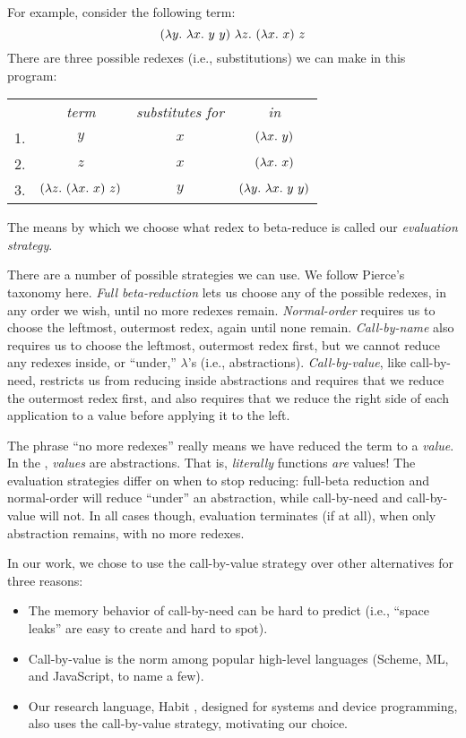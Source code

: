 \documentclass[12pt]{report}
\begin{document}
For example, consider the following term:
\begin{equation}
  \lamAppP{\lamAbs{y}{\lamApp{\lamAbs{x}{y}}{y}}} %
         {\lamAbs{z}{\lamAppP{\lamAbs{x}{x}}{z}}}
\end{equation}
There are three possible redexes (i.e., substitutions) we can make in 
this program:

\begin{center}
  \begin{tabular}{lccc}
    & \emph{term} & \emph{substitutes for} & \emph{in} \\
    \cmidrule(r){2-2} \cmidrule(r){3-3} \cmidrule(r){4-4}
    1. & $y$ & $x$ & $(\lambda x.\ y)$ \\
    2. & $z$ & $x$ & $(\lambda x.\ x)$ \\
    3. & $(\lambda z.\ (\lambda x.\ x)\ z)$ & $y$ & $(\lambda y.\ \lambda x.\ y\ y)$
  \end{tabular}
\end{center}
The means by which we choose what redex to beta-reduce is called our
\emph{evaluation strategy}.

There are a number of possible strategies we can use. We follow
Pierce's taxonomy \citep{PierceXX} here. \emph{Full beta-reduction}
lets us choose any of the possible redexes, in any order we wish,
until no more redexes remain. \emph{Normal-order} requires us to
choose the leftmost, outermost redex, again until none
remain. \emph{Call-by-name} also requires us to choose the leftmost,
outermost redex first, but we cannot reduce any redexes inside, or
``under,'' $\lambda$'s (i.e., abstractions). \emph{Call-by-value},
like call-by-need, restricts us from reducing inside abstractions and
requires that we reduce the outermost redex first, and also requires
that we reduce the right side of each application to a value before
applying it to the left.

The phrase ``no more redexes'' really means we have reduced the term
to a \emph{value}. In the \lamA, \emph{values} are abstractions. That
is, \emph{literally} functions \emph{are} values! The evaluation
strategies differ on when to stop reducing: full-beta reduction and
normal-order will reduce ``under'' an abstraction, while call-by-need
and call-by-value will not. In all cases though, evaluation terminates
(if at all), when only abstraction remains, with no more redexes.

In our work, we chose to use the call-by-value strategy over other
alternatives for three reasons:
\begin{itemize}
\item The memory behavior of call-by-need
  can be hard to predict (i.e., ``space leaks'' are easy to create and
  hard to spot). 
\item Call-by-value is the norm among popular high-level
  languages (Scheme, ML, and JavaScript, to name a few). 
\item Our research
  language, Habit \citep{HabitXX}, designed for systems and device
  programming, also uses the call-by-value strategy, motivating our
  choice.
\end{itemize}
\end{document}
